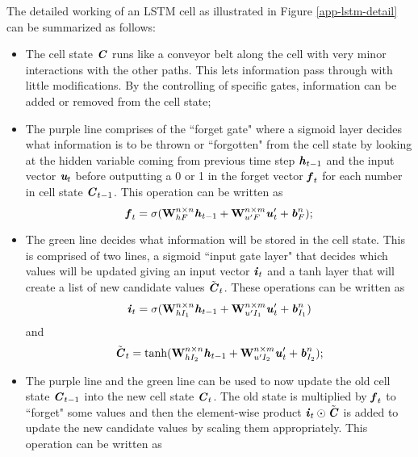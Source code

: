 The detailed working of an LSTM cell as illustrated in Figure \ref{app-lstm-detail} can be summarized as follows:
\begin{itemize}
	\item The cell state $ \textbf{\textit{C}} $ runs like a conveyor belt along the cell with very minor interactions with the other paths. This lets information pass through with little modifications. By the controlling of specific gates, information can be added or removed from the cell state;
	\item The purple line comprises of the ``forget gate" where a sigmoid layer decides what information is to be thrown or ``forgotten" from the cell state by looking at the hidden variable coming from previous time step $ \textbf{\textit{h}}_{t-1} $ and the input vector $ \textit{\textbf{u}}_t $ before outputting a 0 or 1 in the forget vector $ \textbf{\textit{f}}_t $ for each number in cell state $ \textbf{\textit{C}}_{t-1} $. This operation can be written as 
	\begin{equation}\label{app-lstm-1}
	\textbf{\textit{f}}_t = \sigma(\textbf{W}^{n\times n}_{hF}\textbf{\textit{h}}_{t-1}+\textbf{W}^{n\times m}_{u'F}\textbf{\textit{u}}'_{t}+\textbf{\textit{b}}^n_F);
	\end{equation}	
	\item The green line decides what information will be stored in the cell state. This is comprised of two lines, a sigmoid ``input gate layer" that decides which values will be updated giving an input vector $ \textbf{\textit{i}}_t $ and a tanh layer that will create a list of new candidate values $ \tilde{\textbf{\textit{C}}}_t $. These operations can be written as
	\begin{equation}\label{app-lstm-2}
	\textbf{\textit{i}}_t = \sigma(\textbf{W}^{n\times n}_{hI_1}\textbf{\textit{h}}_{t-1}+\textbf{W}^{n\times m}_{u'I_1}\textbf{\textit{u}}'_{t}+\textbf{\textit{b}}^n_{I_1})
	\end{equation}
	and
	\begin{equation}\label{app-lstm-3}
	\tilde{\textbf{\textit{C}}}_t = \tanh(\textbf{W}^{n\times n}_{hI_2}\textbf{\textit{h}}_{t-1}+\textbf{W}^{n\times m}_{u'I_2}\textbf{\textit{u}}'_{t}+\textbf{\textit{b}}^n_{I_2});
	\end{equation}
	\item The purple line and the green line can be used to now update the old cell state $ \textbf{\textit{C}}_{t-1} $ into the new cell state $ \textbf{\textit{C}}_t $. The old state is multiplied by $ \textbf{\textit{f}}_t $ to ``forget" some values and then the element-wise product $ \textbf{\textit{i}}_t\odot\tilde{\textbf{\textit{C}}} $ is added to update the new candidate values by scaling them appropriately. This operation can be written as 

\end{itemize}
